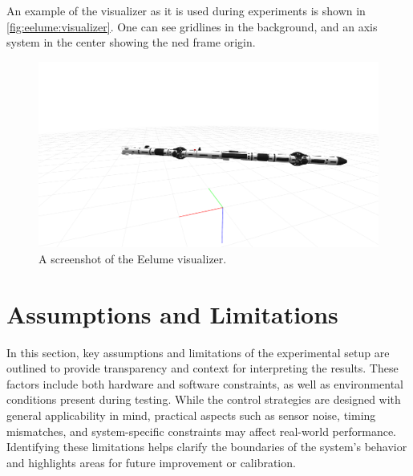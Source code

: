 An example of the visualizer as it is used during experiments is shown in
\autoref{fig:eelume:visualizer}. One can see gridlines in the background, and
an axis system in the center showing the \gls{ned} frame origin.
\begin{figure}[h!]
    \centering
    \includegraphics[width=\textwidth]{assets/eely-visualizer.png}
    \caption{A screenshot of the Eelume visualizer.}
    \label{fig:eelume:visualizer}
\end{figure}

\section{Assumptions and Limitations}
\label{sec:experimental_setup:assumptions_and_limitations}
In this section, key assumptions and limitations of the experimental setup are 
outlined to provide transparency and context for interpreting the results. 
These factors include both hardware and software constraints, as well as 
environmental conditions present during testing. While the control strategies 
are designed with general applicability in mind, practical aspects such as 
sensor noise, timing mismatches, and system-specific constraints may affect 
real-world performance. Identifying these limitations helps clarify the 
boundaries of the system's behavior and highlights areas for future 
improvement or calibration.

